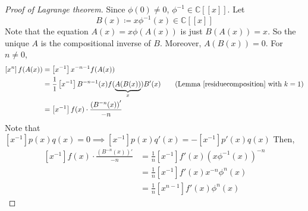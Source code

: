 \begin{proof}[Proof of Lagrange theorem]
Since \(\phi(0)\neq0\), \(\phi^{-1}\in\mathbb{C}[[x]]\).
Let
\[ B(x)\coloneqq x\phi^{-1}(x)\in\mathbb{C}[[x]] \]
Note that the equation \(A(x)=x\phi(A(x))\) is just \(B(A(x))=x\).
So the unique \(A\) is the compositional inverse of \(B\).
Moreover, \(A(B(x))=0\).
For \(n\neq0\),
\begin{align*}
\left[x^n\right]f(A(x))&=\left[x^{-1}\right]x^{-n-1}f(A(x))\\
&=\frac{1}{1}\left[x^{-1}\right]B^{-n-1}(x)f(\underbrace{A(B(x))}_{x})B'(x) \tag{Lemma \ref{residuecomposition} with \(k=1\)}\\
&=\left[x^{-1}\right]f(x)\cdot\frac{\left(B^{-n}(x)\right)'}{-n}
\end{align*}
Note that \(\left[x^{-1}\right]p(x)q(x)=0\implies\left[x^{-1}\right]p(x)q'(x)=-\left[x^{-1}\right]p'(x)q(x)\)
Then,
\begin{align*}
\left[x^{-1}\right]f(x)\cdot\frac{\left(B^{-n}(x)\right)'}{-n}&=\frac{1}{n}\left[x^{-1}\right]f'(x)\left(x\phi^{-1}(x)\right)^{-n}\\
&=\frac{1}{n}\left[x^{-1}\right]f'(x)x^{-n}\phi^n(x)\\
&=\frac{1}{n}\left[x^{n-1}\right]f'(x)\phi^n(x)
\end{align*}
\end{proof}